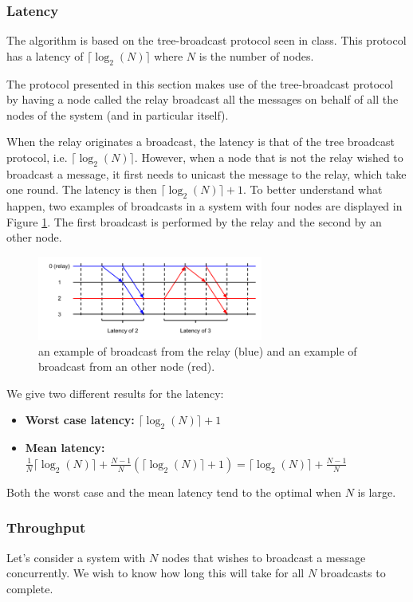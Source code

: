 \documentclass[a4paper]{article}
\begin{document}
\subsubsection{Latency}
The algorithm is based on the tree-broadcast protocol seen in class. This
protocol has a latency of $\lceil\log_2(N)\rceil$ where $N$ is the number of
nodes.

The protocol presented in this section makes use of the tree-broadcast
protocol by having a node called the relay broadcast all the messages on
behalf of all the nodes of the system (and in particular itself).

When the relay originates a broadcast, the latency is that of the tree
broadcast protocol, i.e. $\lceil\log_2(N)\rceil$. However, when a node that is
not the relay wished to broadcast a message, it first needs to unicast the
message to the relay, which take one round. The latency is then
$\lceil\log_2(N)\rceil + 1$. To better understand what happen, two examples
of broadcasts in a system with four nodes are displayed in Figure
\ref{figure:latency}. The first broadcast is performed by the relay and the
second by an other node.

\begin{figure}[h]
    \centering
    \includegraphics[width=280px]{Latency.png}
    \caption{an example of broadcast from the relay (blue) and an example of broadcast from an other node (red).}
    \label{figure:latency}
\end{figure}

We give two different results for the latency:
\begin{itemize}
    \item \textbf{Worst case latency:} $\lceil\log_2(N)\rceil + 1$
    \item \textbf{Mean latency:} $\frac{1}{N} \lceil\log_2(N)\rceil +
        \frac{N-1}{N} (\lceil\log_2(N)\rceil + 1)
        = \lceil\log_2(N)\rceil + \frac{N-1}{N}$
\end{itemize}

Both the worst case and the mean latency tend to the optimal when $N$ is
large.

\subsubsection{Throughput}
Let's consider a system with $N$ nodes that wishes to broadcast a message
concurrently. We wish to know how long this will take for all $N$ broadcasts
to complete.
\end{document}

